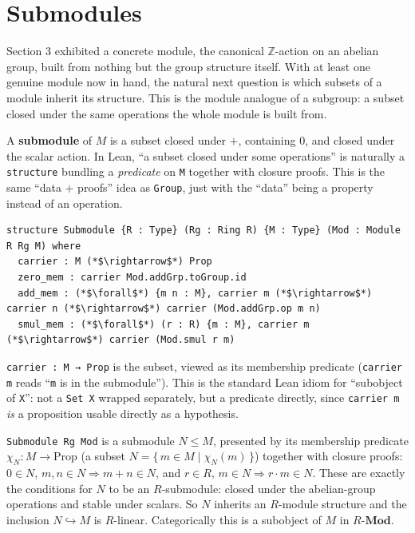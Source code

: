 \section{Submodules}\label{sec:10-modules:04-submodules:1}

Section 3 exhibited a concrete module, the canonical \(\mathbb{Z}\)-action on an abelian group, built from nothing but the group structure itself. With at least one genuine module now in hand, the natural next question is which subsets of a module inherit its structure. This is the module analogue of a subgroup: a subset closed under the same operations the whole module is built from.

A \textbf{submodule} of \(M\) is a subset closed under \(+\), containing \(0\), and closed under the scalar action. In Lean, ``a subset closed under some operations'' is naturally a \texttt{structure} bundling a \emph{predicate} on \texttt{M} together with closure proofs. This is the same ``data + proofs'' idea as \texttt{Group}, just with the ``data'' being a property instead of an operation.

\begin{lstlisting}
structure Submodule {R : Type} (Rg : Ring R) {M : Type} (Mod : Module R Rg M) where
  carrier : M (*$\rightarrow$*) Prop
  zero_mem : carrier Mod.addGrp.toGroup.id
  add_mem : (*$\forall$*) {m n : M}, carrier m (*$\rightarrow$*) carrier n (*$\rightarrow$*) carrier (Mod.addGrp.op m n)
  smul_mem : (*$\forall$*) (r : R) {m : M}, carrier m (*$\rightarrow$*) carrier (Mod.smul r m)
\end{lstlisting}

\texttt{carrier : M → Prop} is the subset, viewed as its membership predicate (\texttt{carrier m} reads ``\texttt{m} is in the submodule''). This is the standard Lean idiom for ``subobject of \texttt{X}'': not a \texttt{Set X} wrapped separately, but a predicate directly, since \texttt{carrier m} \emph{is} a proposition usable directly as a hypothesis.

\begin{mathreading}

\texttt{Submodule Rg Mod} is a submodule \(N \le M\), presented by its membership predicate \(\chi_N : M \to \mathrm{Prop}\) (a subset \(N = \{\,m \in M \mid \chi_N(m)\,\}\)) together with closure proofs: \(0 \in N\), \(m,n \in N \Rightarrow m+n \in N\), and \(r\in R,\, m\in N \Rightarrow r\cdot m \in N\). These are exactly the conditions for \(N\) to be an \(R\)-submodule: closed under the abelian-group operations and stable under scalars. So \(N\) inherits an \(R\)-module structure and the inclusion \(N \hookrightarrow M\) is \(R\)-linear. Categorically this is a subobject of \(M\) in \(R\text{-}\mathbf{Mod}\).

\end{mathreading}

